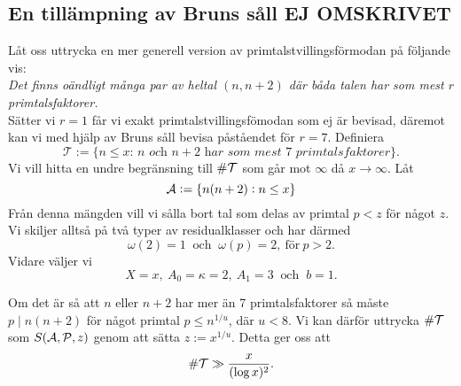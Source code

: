 



\subsection{En tillämpning av Bruns såll EJ OMSKRIVET}
Låt oss uttrycka en mer generell version av primtalstvillingsförmodan på följande vis:\\
\textit{Det finns oändligt många par av heltal $(n, n+2)$ där båda talen har som mest $r$ primtalsfaktorer.}\\
Sätter vi $r=1$ får vi exakt primtalstvillingsfömodan som ej är bevisad, däremot kan vi med hjälp av Bruns såll bevisa påståendet för $r=7$. Definiera
\begin{equation*}
    \mathcal{T} := \{\textit{$n\leq x$: $n$ och $n+2$ har som mest $7$ primtalsfaktorer}\}.
\end{equation*}
Vi vill hitta en undre begränsning till $\card{\mathcal{T}}$ som går mot $\infty$ då $x\to\infty$. Låt
\begin{equation*}
    \A := \{n(n+2): n\leq x\}
\end{equation*}
Från denna mängden vill vi sålla bort tal som delas av primtal $p<z$ för något $z$. Vi skiljer alltså på två typer av residualklasser och har därmed
\begin{equation*}
    \omega(2)=1\ \text{ och }\ \omega(p)=2,\ \text{för}\ p>2.
\end{equation*}
Vidare väljer vi
\begin{equation*}
    X=x,\ 
    A_0=\kappa=2,\ 
    A_1=3\
    \text{ och }\
    b=1.
\end{equation*}


Om det är så att $n$ eller $n+2$ har mer än 7 primtalsfaktorer så måste $p\mid n(n+2)$ för något primtal $p\leq n^{1/u}$, där $u<8$. Vi kan därför uttrycka $\card\mathcal{T}$ som $\S{A}{P}{z}$ genom att sätta $z := x^{1/u}$. Detta ger oss att
\begin{equation*}
    \card\mathcal{T} \gg \frac{x}{(\log x)^2}.
\end{equation*}






\begin{comment}

två funktioner $g_U$ och $g_L$ som uppfyller 
\begin{alignat*}{3}
    g_U(1)&=1,\quad \text{och}&\quad \mu(d)(g_U(d)-g_U(pd)) &\geq 0, \\
    g_L(1)&=1,\quad \text{och}&\quad \mu(d)(g_L(d)-g_L(pd)) &\leq 0,
\end{alignat*}






\end{comment}